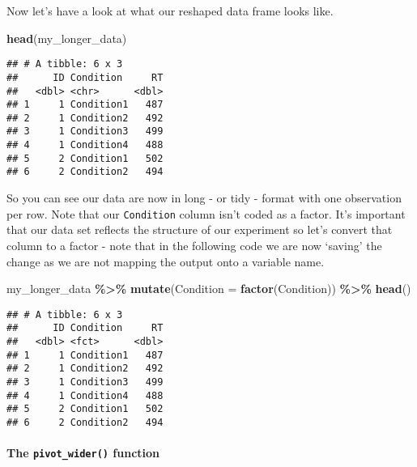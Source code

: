 \documentclass[
]{book}
\newenvironment{Shaded}{\begin{snugshade}}{\end{snugshade}}
\newcommand{\AttributeTok}[1]{\textcolor[rgb]{0.13,0.29,0.53}{#1}}
\newcommand{\FunctionTok}[1]{\textcolor[rgb]{0.13,0.29,0.53}{\textbf{#1}}}
\newcommand{\NormalTok}[1]{#1}
\newcommand{\SpecialCharTok}[1]{\textcolor[rgb]{0.81,0.36,0.00}{\textbf{#1}}}
\begin{document}
Now let's have a look at what our reshaped data frame looks like.

\begin{Shaded}
\begin{Highlighting}[]
\FunctionTok{head}\NormalTok{(my\_longer\_data)}
\end{Highlighting}
\end{Shaded}

\begin{verbatim}
## # A tibble: 6 x 3
##      ID Condition     RT
##   <dbl> <chr>      <dbl>
## 1     1 Condition1   487
## 2     1 Condition2   492
## 3     1 Condition3   499
## 4     1 Condition4   488
## 5     2 Condition1   502
## 6     2 Condition2   494
\end{verbatim}

So you can see our data are now in long - or tidy - format with one observation per row. Note that our \texttt{Condition} column isn't coded as a factor. It's important that our data set reflects the structure of our experiment so let's convert that column to a factor - note that in the following code we are now `saving' the change as we are not mapping the output onto a variable name.

\begin{Shaded}
\begin{Highlighting}[]
\NormalTok{my\_longer\_data }\SpecialCharTok{\%\textgreater{}\%}
  \FunctionTok{mutate}\NormalTok{(}\AttributeTok{Condition =} \FunctionTok{factor}\NormalTok{(Condition)) }\SpecialCharTok{\%\textgreater{}\%}
  \FunctionTok{head}\NormalTok{()}
\end{Highlighting}
\end{Shaded}

\begin{verbatim}
## # A tibble: 6 x 3
##      ID Condition     RT
##   <dbl> <fct>      <dbl>
## 1     1 Condition1   487
## 2     1 Condition2   492
## 3     1 Condition3   499
## 4     1 Condition4   488
## 5     2 Condition1   502
## 6     2 Condition2   494
\end{verbatim}

\hypertarget{the-pivot_wider-function}{%
\paragraph*{\texorpdfstring{The \texttt{pivot\_wider()} function}{The pivot\_wider() function}}\label{the-pivot_wider-function}}
\end{document}
